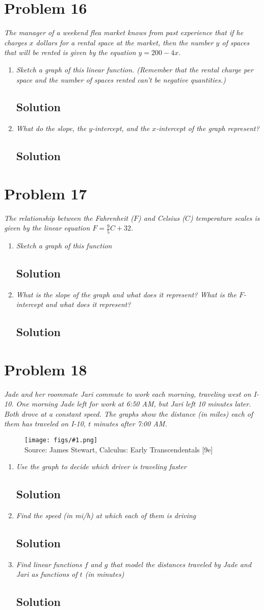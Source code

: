 \documentclass[11pt]{article}
\newcommand{\soln}{\subsection*}
\newcommand{\qn}{\textit}
\newcommand{\imagesource}[1]{{\footnotesize Source: #1}}
\newcommand{\imgqn}[1]{
	\begin{figure}[H]
		\centering
		\texttt{[image: figs/\#1.png]}\\
		\imagesource{James Stewart, Calculus: Early Transcendentals [9e]}
	\end{figure}
}
\begin{document}
\section*{Problem 16}

\qn{The manager of a weekend flea market knows from past experience that if he charges $x$ dollars for a rental space at the market, then the number $y$ of spaces that will be rented is given by the equation $y=200-4x$.}

\begin{enumerate}
	\item \qn{Sketch a graph of this linear function. (Remember that the rental charge per space and the number of spaces rented can't be negative quantities.)}
	\soln{Solution}
	
	\item \qn{What do the slope, the $y$-intercept, and the $x$-intercept of the graph represent?}
	\soln{Solution}
\end{enumerate}

\section*{Problem 17}

\qn{The relationship between the Fahrenheit ($F$) and Celsius ($C$) temperature scales is given by the linear equation $F=\frac{9}{5}C+32$.}

\begin{enumerate}
	\item \qn{Sketch a graph of this function}
	\soln{Solution}
	
	\item \qn{What is the slope of the graph and what does it represent? What is the $F$-intercept and what does it represent?}
	\soln{Solution}
\end{enumerate}

\section*{Problem 18}

\qn{Jade and her roommate Jari commute to work each morning, traveling west on I-10. One morning Jade left for work at 6:50 AM, but Jari left 10 minutes later. Both drove at a constant speed. The graphs show the distance (in miles) each of them has traveled on I-10, $t$ minutes after 7:00 AM.}

\imgqn{1.2.18}

\begin{enumerate}
	\item \qn{Use the graph to decide which driver is traveling faster}
	\soln{Solution}
	
	\item \qn{Find the speed (in mi/h) at which each of them is driving}
	\soln{Solution}
	
	\item \qn{Find linear functions $f$ and $g$ that model the distances traveled by Jade and Jari as functions of $t$ (in minutes)}
	\soln{Solution}
\end{enumerate}
\end{document}

